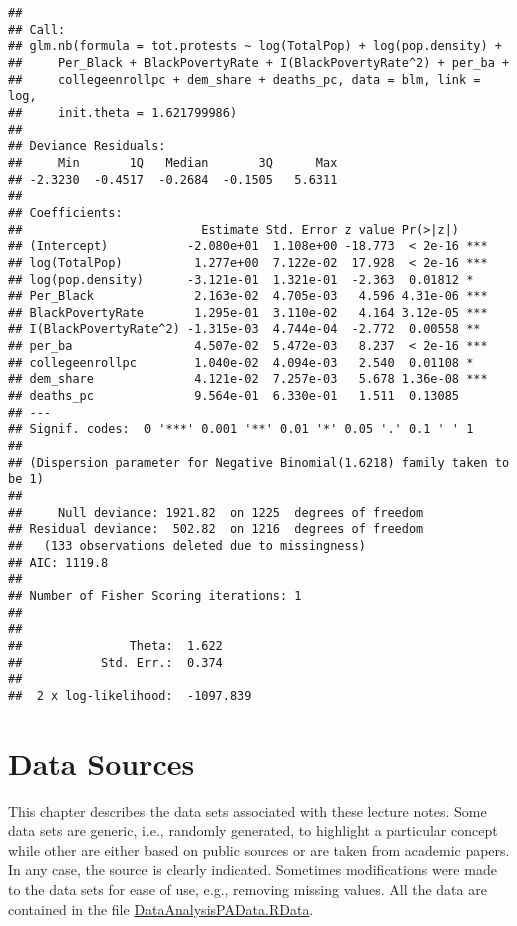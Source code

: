 \documentclass[
]{article}
\begin{document}
\begin{verbatim}
## 
## Call:
## glm.nb(formula = tot.protests ~ log(TotalPop) + log(pop.density) + 
##     Per_Black + BlackPovertyRate + I(BlackPovertyRate^2) + per_ba + 
##     collegeenrollpc + dem_share + deaths_pc, data = blm, link = log, 
##     init.theta = 1.621799986)
## 
## Deviance Residuals: 
##     Min       1Q   Median       3Q      Max  
## -2.3230  -0.4517  -0.2684  -0.1505   5.6311  
## 
## Coefficients:
##                         Estimate Std. Error z value Pr(>|z|)    
## (Intercept)           -2.080e+01  1.108e+00 -18.773  < 2e-16 ***
## log(TotalPop)          1.277e+00  7.122e-02  17.928  < 2e-16 ***
## log(pop.density)      -3.121e-01  1.321e-01  -2.363  0.01812 *  
## Per_Black              2.163e-02  4.705e-03   4.596 4.31e-06 ***
## BlackPovertyRate       1.295e-01  3.110e-02   4.164 3.12e-05 ***
## I(BlackPovertyRate^2) -1.315e-03  4.744e-04  -2.772  0.00558 ** 
## per_ba                 4.507e-02  5.472e-03   8.237  < 2e-16 ***
## collegeenrollpc        1.040e-02  4.094e-03   2.540  0.01108 *  
## dem_share              4.121e-02  7.257e-03   5.678 1.36e-08 ***
## deaths_pc              9.564e-01  6.330e-01   1.511  0.13085    
## ---
## Signif. codes:  0 '***' 0.001 '**' 0.01 '*' 0.05 '.' 0.1 ' ' 1
## 
## (Dispersion parameter for Negative Binomial(1.6218) family taken to be 1)
## 
##     Null deviance: 1921.82  on 1225  degrees of freedom
## Residual deviance:  502.82  on 1216  degrees of freedom
##   (133 observations deleted due to missingness)
## AIC: 1119.8
## 
## Number of Fisher Scoring iterations: 1
## 
## 
##               Theta:  1.622 
##           Std. Err.:  0.374 
## 
##  2 x log-likelihood:  -1097.839
\end{verbatim}

\hypertarget{data-sources}{%
\section{Data Sources}\label{data-sources}}

This chapter describes the data sets associated with these lecture notes. Some data sets are generic, i.e., randomly generated, to highlight a particular concept while other are either based on public sources or are taken from academic papers. In any case, the source is clearly indicated. Sometimes modifications were made to the data sets for ease of use, e.g., removing missing values. All the data are contained in the file \href{https://github.com/jrfdumortier/dataanalysis/blob/master/DataAnalysisPAData.RData}{DataAnalysisPAData.RData}.
\end{document}
